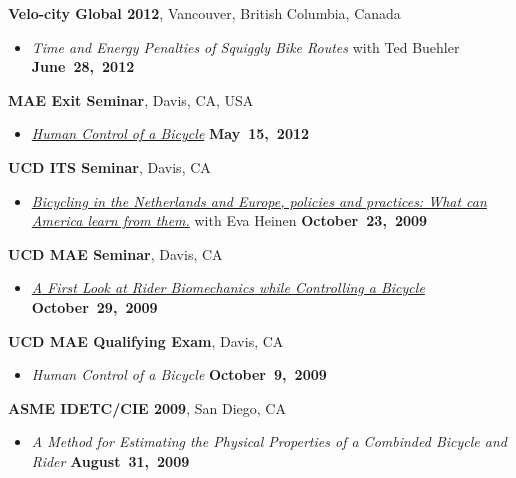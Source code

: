 \documentclass[10pt]{article}
\newenvironment{outerlist}[1][\enskip\textbullet]%
        {\begin{itemize}[#1]}{\end{itemize}%
         \vspace{-.6\baselineskip}}
\newcommand{\blankline}{\quad\pagebreak[2]}
\begin{document}
\blankline

\textbf{Velo-city Global 2012}, Vancouver, British Columbia, Canada
\begin{outerlist}
  \item[] \textit{Time and Energy Penalties of Squiggly Bike Routes} with Ted
    Buehler
  \hfill \textbf{June~28,~2012}
\end{outerlist}

\blankline

\textbf{MAE Exit Seminar}, Davis, CA, USA
\begin{outerlist}
  \item[] \textit{\href{http://youtu.be/oKbaHCGK94E}{Human Control of a
    Bicycle}}
  \hfill \textbf{May~15,~2012}
\end{outerlist}

\blankline

\textbf{UCD ITS Seminar}, Davis, CA
\begin{outerlist}
\item[]
  \textit{\href{http://www.its.ucdavis.edu/?seminar=october-23-2009}{Bicycling
    in the Netherlands and Europe, policies and practices: What can America
    learn from them.}} with Eva Heinen
    \hfill \textbf{October~23,~2009}
\end{outerlist}

\blankline

\textbf{UCD MAE Seminar}, Davis, CA
\begin{outerlist}
  \item[]
    \textit{\href{http://archive.org/details/AFirstLookAtRiderBiomechanicsWhileControllingABicycle}{A
      First Look at Rider Biomechanics while Controlling a Bicycle}}
    \hfill \textbf{October~29,~2009}
\end{outerlist}

\blankline

\textbf{UCD MAE Qualifying Exam}, Davis, CA
\begin{outerlist}
  \item[] \textit{Human Control of a Bicycle}
    \hfill \textbf{October~9,~2009}
\end{outerlist}

\blankline

\textbf{ASME IDETC/CIE 2009}, San Diego, CA
\begin{outerlist}
  \item[] \textit{A Method for Estimating the Physical Properties of a Combinded Bicycle and
Rider}
    \hfill \textbf{August~31,~2009}
\end{outerlist}
\end{document}

